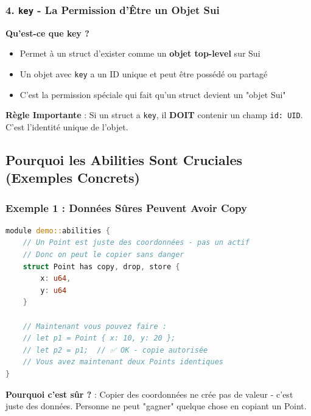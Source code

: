 \documentclass[11pt]{article}
\begin{document}
\subsubsection{4. \texttt{key} - La Permission d'Être un Objet Sui}

\begin{explainBox}
\textbf{Qu'est-ce que key ?}
\begin{itemize}
  \item Permet à un struct d'exister comme un \textbf{objet top-level} sur Sui
  \item Un objet avec \texttt{key} a un ID unique et peut être possédé ou partagé
  \item C'est la permission spéciale qui fait qu'un struct devient un "objet Sui"
\end{itemize}
\end{explainBox}

\begin{noteBox}
\textbf{Règle Importante} : Si un struct a \texttt{key}, il \textbf{DOIT} contenir un champ \texttt{id: UID}. C'est l'identité unique de l'objet.
\end{noteBox}

\subsection{Pourquoi les Abilities Sont Cruciales (Exemples Concrets)}

\subsubsection{Exemple 1 : Données Sûres Peuvent Avoir Copy}

\begin{lstlisting}[language=Rust, caption=Point avec Copy - C'est OK]
module demo::abilities {
    // Un Point est juste des coordonnées - pas un actif
    // Donc on peut le copier sans danger
    struct Point has copy, drop, store {
        x: u64,
        y: u64
    }
    
    // Maintenant vous pouvez faire :
    // let p1 = Point { x: 10, y: 20 };
    // let p2 = p1;  // ✅ OK - copie autorisée
    // Vous avez maintenant deux Points identiques
}
\end{lstlisting}

\begin{noteBox}
\textbf{Pourquoi c'est sûr ?} : Copier des coordonnées ne crée pas de valeur - c'est juste des données. Personne ne peut "gagner" quelque chose en copiant un Point.
\end{noteBox}
\end{document}
